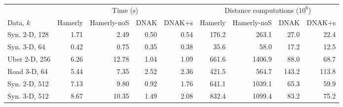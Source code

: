 \begin{tabular}{lrrrrrrrr}
\toprule
 & \multicolumn{4}{c}{Time (s)} & \multicolumn{4}{c}{Distance computations ($10^6$)} \\
\cmidrule(lr){2-5}\cmidrule(lr){6-9}
Data, $k$ & Hamerly & Hamerly-noS & DNAK & DNAK+s & Hamerly & Hamerly-noS & DNAK & DNAK+s \\
\midrule
Syn. 2-D, 128 & 1.71 & 2.49 & 0.50 & 0.54 & 176.2 & 263.1 & 27.0 & 22.4 \\
Syn. 3-D, 64 & 0.42 & 0.75 & 0.35 & 0.38 & 35.6 & 58.0 & 17.2 & 12.5 \\
Uber 2-D, 256 & 6.26 & 12.78 & 1.04 & 1.09 & 661.6 & 1406.9 & 88.0 & 68.7 \\
Road 3-D, 64 & 5.44 & 7.35 & 2.52 & 2.36 & 421.5 & 564.7 & 143.2 & 113.8 \\
Syn. 2-D, 512 & 7.13 & 9.80 & 0.92 & 1.76 & 641.1 & 1039.1 & 65.3 & 59.9 \\
Syn. 3-D, 512 & 8.67 & 10.35 & 1.49 & 2.08 & 832.4 & 1099.4 & 83.2 & 75.2 \\
\bottomrule
\end{tabular}
